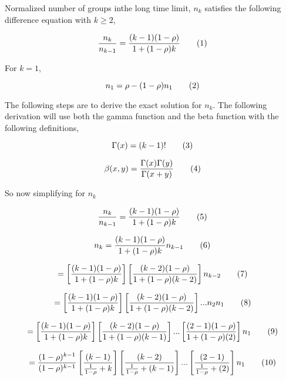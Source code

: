 Normalized number of groups inthe long time limit, $n_k$ satisfies the following difference equation with $k \geq 2$,

\[
  \frac{
    n_k
  }{
    n_{k-1}
  }
  =
  \frac{
    (k - 1)(1 - \rho)
  }{
    1 + (1 - \rho)k
  }
  \addtag
\]

For $k=1$,

\[
  n_1
  =
  \rho - (1 - \rho) n_1
  \addtag
\]

The following steps are to derive the exact solution for $n_k$. The following derivation will use both the gamma function and the beta function with the following definitions,

\[
  \Gamma(x) = (k - 1)!
  \addtag
\]

\[
  \beta(x, y) =
  \frac{
    \Gamma(x) \Gamma(y)
  }{
    \Gamma(x + y)
  }
  \addtag
\]

So now simplifying for $n_k$

\[
  \frac{
    n_k
  }{
    n_{k-1}
  }
  =
  \frac{
    (k - 1)(1 - \rho)
  }{
    1 + (1 - \rho)k
  }
  \addtag
\]


\[
  n_k
  =
  \frac{
    (k - 1)(1 - \rho)
  }{
    1 + (1 - \rho)k
  }
  n_{k-1}
  \addtag
\]

\[
  =
  \left[
    \frac{
      (k - 1)(1 - \rho)
    }{
      1 + (1 - \rho)k
    }
  \right]
  \left[
    \frac{
      (k - 2)(1 - \rho)
    }{
      1 + (1 - \rho)(k - 2)
    }
  \right]
  n_{k-2}
  \addtag
\]

\[
  =
  \left[
    \frac{
      (k - 1)(1 - \rho)
    }{
      1 + (1 - \rho)k
    }
  \right]
  \left[
    \frac{
      (k - 2)(1 - \rho)
    }{
      1 + (1 - \rho)(k - 2)
    }
  \right]
  ...
  n_2
  n_1
  \addtag
\]

\[
  =
  \left[
    \frac{
      (k - 1)(1 - \rho)
    }{
      1 + (1 - \rho)k
    }
  \right]
  \left[
    \frac{
      (k - 2)(1 - \rho)
    }{
      1 + (1 - \rho)(k - 1)
    }
  \right]
  ...
  \left[
    \frac{
      (2 - 1)(1 - \rho)
    }{
      1 + (1 - \rho)(2)
    }
  \right]
  n_1
  \addtag
\]


\[
  =
  \frac{
    (1 - \rho)^{k - 1}
  }{
    (1 - \rho)^{k - 1}
  }
  \left[
    \frac{
      (k - 1)
    }{
      \frac{1}{1 - \rho} + k
    }
  \right]
  \left[
    \frac{
      (k - 2)
    }{
      \frac{1}{1 - \rho} + (k - 1)
    }
  \right]
  ...
  \left[
    \frac{
      (2 - 1)
    }{
      \frac{1}{1 - \rho} + (2)
    }
  \right]
  n_1
  \addtag
\]


